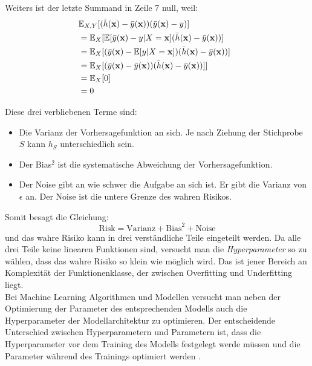 Weiters ist der letzte Summand in Zeile 7 null, weil:
\begin{equation*}
  \begin{split}
    \lefteqn{ \mathbb{E}_{X, Y}[(\bar{h}(\mathbf{x})-\bar{y}(\mathbf{x}))(\bar{y}(\mathbf{x})-y)] } \\\
    & = \mathbb{E}_{X}[\mathbb{E}[\bar{y}(\mathbf{x})-y|X = \mathbf{x}](\bar{h}(\mathbf{x})-\bar{y}(\mathbf{x}))] \\\
    & = \mathbb{E}_{X}[(\bar{y}(\mathbf{x})-\mathbb{E}[y|X = \mathbf{x}])(\bar{h}(\mathbf{x})-\bar{y}(\mathbf{x}))] \\\
    & = \mathbb{E}_{X}[(\bar{y}(\mathbf{x})-\bar{y}(\mathbf{x}))(\bar{h}(\mathbf{x})-\bar{y}(\mathbf{x}))]] \\\
    & = \mathbb{E}_{X}[0]\\\
    & = 0
  \end{split}
\end{equation*}


Diese drei verbliebenen Terme sind:
\begin{itemize}
  \item Die Varianz der Vorhersagefunktion an sich. Je nach Ziehung der Stichprobe $S$ kann $h_S$ unterschiedlich sein.
  \item Der Bias$^2$ ist die systematische Abweichung der Vorhersagefunktion. %
  \item Der Noise gibt an wie schwer die Aufgabe an sich ist. Er gibt die Varianz von $\epsilon$ an. Der Noise ist die untere Grenze des wahren Risikos.
\end{itemize}

Somit besagt die Gleichung:
$$ \text{Risk} = \text{Varianz} + \text{Bias}^2 + \text{Noise} $$
und das wahre Risiko kann in drei verst\"andliche Teile eingeteilt werden. Da alle drei Teile keine linearen Funktionen sind, 
versucht man die \textit{Hyperparameter} so zu w\"ahlen, dass das wahre Risiko so klein wie 
m\"oglich wird. Das ist jener Bereich an Komplexit\"at der Funktionenklasse, der zwischen Overfitting und Underfitting liegt. \\


Bei Machine Learning Algorithmen und Modellen versucht man neben der Optimierung der Parameter des entsprechenden Modells 
auch die Hyperparameter der Modellarchitektur zu optimieren. Der entscheidende Unterschied zwischen Hyperparametern
und Parametern ist, dass die Hyperparameter vor dem Training des Modells festgelegt werde m\"ussen und die Parameter w\"ahrend des Trainings
optimiert werden \cite{hyper}. \\

